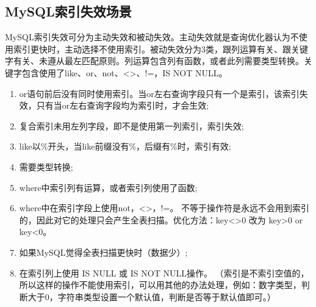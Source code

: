 \documentclass[../../../interview-questions.tex]{subfiles}
\begin{document}
\subsection{MySQL索引失效场景}

MySQL索引失效可分为主动失效和被动失效。主动失效就是查询优化器认为不使用索引更快时，主动选择不使用索引。被动失效分为3类，跟列运算有关、跟关键字有关、未遵从最左匹配原则。列运算包含列有函数，或者此列需要类型转换。关键字包含使用了like、or、not、<>、!=，IS NOT NULL。

\begin{enumerate}
\item {or语句前后没有同时使用索引。当or左右查询字段只有一个是索引，该索引失效，只有当or左右查询字段均为索引时，才会生效;}
\item {复合索引未用左列字段，即不是使用第一列索引，索引失效;}
\item {like以\%开头，当like前缀没有\%，后缀有\%时，索引有效;}
\item {需要类型转换;}
\item {where中索引列有运算，或者索引列使用了函数;}
\item {where中在索引字段上使用not，<>，!=。}
  不等于操作符是永远不会用到索引的，因此对它的处理只会产生全表扫描。优化方法：key<>0 改为 key>0 or key<0。
\item {如果MySQL觉得全表扫描更快时（数据少）;}
\item {在索引列上使用 IS NULL 或 IS NOT NULL操作。}
（索引是不索引空值的，所以这样的操作不能使用索引，可以用其他的办法处理，例如：数字类型，判断大于0，字符串类型设置一个默认值，判断是否等于默认值即可。）
\end{enumerate}
\end{document}
